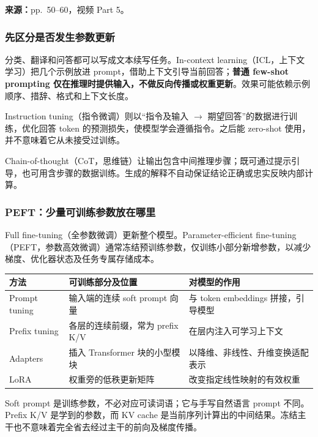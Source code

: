 
\textbf{来源：}pp.~50--60，视频 Part 5。

\subsubsection{先区分是否发生参数更新}

分类、翻译和问答都可以写成文本续写任务。In-context learning（ICL，上下文学习）把几个示例放进 prompt，借助上下文引导当前回答；\textbf{普通 few-shot prompting 仅在推理时提供输入，不做反向传播或权重更新}。效果可能依赖示例顺序、措辞、格式和上下文长度。

Instruction tuning（指令微调）则以“指令及输入 $\to$ 期望回答”的数据进行训练，优化回答 token 的预测损失，使模型学会遵循指令。之后能 zero-shot 使用，并不意味着它从未接受过训练。

Chain-of-thought（CoT，思维链）让输出包含中间推理步骤；既可通过提示引导，也可用含步骤的数据训练。生成的解释不自动保证结论正确或忠实反映内部计算。

\subsubsection{PEFT：少量可训练参数放在哪里}

Full fine-tuning（全参数微调）更新整个模型。Parameter-efficient fine-tuning（PEFT，参数高效微调）通常冻结预训练参数，仅训练小部分新增参数，以减少梯度、优化器状态及任务专属存储成本。

\begin{center}
\small
\begin{tabularx}{\textwidth}{@{}lXX@{}}
\toprule
方法 & 可训练部分及位置 & 对模型的作用 \\
\midrule
Prompt tuning & 输入端的连续 soft prompt 向量 & 与 token embeddings 拼接，引导模型 \\
Prefix tuning & 各层的连续前缀，常为 prefix K/V & 在层内注入可学习上下文 \\
Adapters & 插入 Transformer 块的小型模块 & 以降维、非线性、升维变换适配表示 \\
LoRA & 权重旁的低秩更新矩阵 & 改变指定线性映射的有效权重 \\
\bottomrule
\end{tabularx}
\end{center}
Soft prompt 是训练参数，不必对应可读词语；它与手写自然语言 prompt 不同。Prefix K/V 是学到的参数，而 KV cache 是当前序列计算出的中间结果。冻结主干也不意味着完全省去经过主干的前向及梯度传播。

